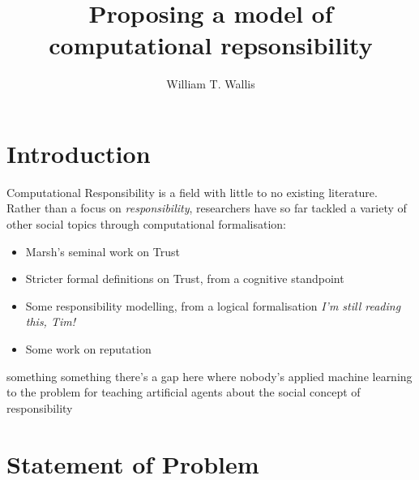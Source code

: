 \documentclass{mprop}
\begin{document}
\title{Proposing a model of computational repsonsibility}
\author{William T. Wallis}
\date{}
\maketitle

\tableofcontents
\newpage

\section{Introduction}\label{intro}

Computational Responsibility is a field with little to no existing literature. Rather than a focus on \emph{responsibility}, researchers have so far tackled a variety of other social topics through computational formalisation:

\begin{itemize}
    \item Marsh's seminal work on Trust\cite{Marsh1994FormalisingConcept}
    
    \item Stricter formal definitions on Trust, from a cognitive standpoint\cite{CastelfranchiSocialApproach}
    
    \item Some responsibility modelling, from a logical formalisation\cite{Simpson2015FormalisingAnalysis} \emph{I'm still reading this, Tim!}
    
    \item Some work on reputation \cite{Chandrasekaran2011ASystems}
    
\end{itemize}

something something there's a gap here where nobody's applied machine learning to the problem for teaching artificial agents about the social concept of responsibility


\section{Statement of Problem}
\end{document}
